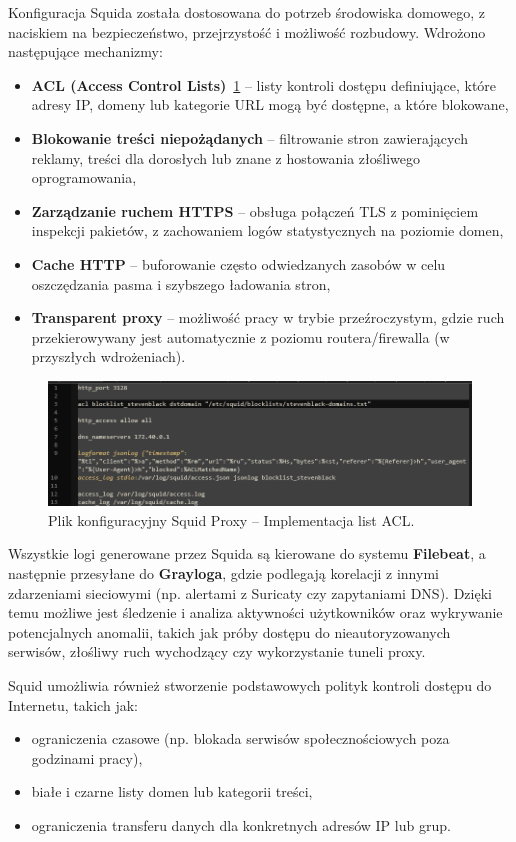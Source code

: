 \documentclass[
    left=2.5cm,         %
    right=2.5cm,        %
    top=2.5cm,          %
    bottom=3cm,         %
    bindingoffset=6mm,  %
    nohyphenation=true %
]{eiti/eiti-thesis} %
\begin{document}
Konfiguracja Squida została dostosowana do potrzeb środowiska domowego, z naciskiem na bezpieczeństwo, przejrzystość i możliwość rozbudowy. Wdrożono następujące mechanizmy:
\begin{itemize}
    \item \textbf{ACL (Access Control Lists)}~\ref{fig:squid-acl} – listy kontroli dostępu definiujące, które adresy IP, domeny lub kategorie URL mogą być dostępne, a które blokowane,
    \item \textbf{Blokowanie treści niepożądanych} – filtrowanie stron zawierających reklamy, treści dla dorosłych lub znane z hostowania złośliwego oprogramowania,
    \item \textbf{Zarządzanie ruchem HTTPS} – obsługa połączeń TLS z pominięciem inspekcji pakietów, z zachowaniem logów statystycznych na poziomie domen,
    \item \textbf{Cache HTTP} – buforowanie często odwiedzanych zasobów w celu oszczędzania pasma i szybszego ładowania stron,
    \item \textbf{Transparent proxy} – możliwość pracy w trybie przeźroczystym, gdzie ruch przekierowywany jest automatycznie z poziomu routera/firewalla (w przyszłych wdrożeniach).
\end{itemize}

\begin{figure}[H]
    \centering
    \includegraphics[width=\textwidth]{img/squid-acl.png}
    \caption{Plik konfiguracyjny Squid Proxy – Implementacja list ACL.}
    \label{fig:squid-acl}
\end{figure}

Wszystkie logi generowane przez Squida są kierowane do systemu \textbf{Filebeat}, a następnie przesyłane do \textbf{Grayloga}, gdzie podlegają korelacji z innymi zdarzeniami sieciowymi (np. alertami z Suricaty czy zapytaniami DNS). Dzięki temu możliwe jest śledzenie i analiza aktywności użytkowników oraz wykrywanie potencjalnych anomalii, takich jak próby dostępu do nieautoryzowanych serwisów, złośliwy ruch wychodzący czy wykorzystanie tuneli proxy.

Squid umożliwia również stworzenie podstawowych polityk kontroli dostępu do Internetu, takich jak:
\begin{itemize}
    \item ograniczenia czasowe (np. blokada serwisów społecznościowych poza godzinami pracy),
    \item białe i czarne listy domen lub kategorii treści,
    \item ograniczenia transferu danych dla konkretnych adresów IP lub grup.
\end{itemize}
\end{document}
